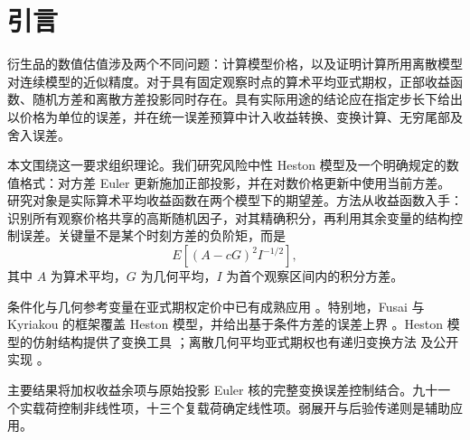 \begin{abstract}
本文研究指定 Heston 模型及其原始方差正部 Euler 格式下、具有十二个月度观察时点的有界算术平均亚式看涨价差
\(\psi(A)=(A-95)^+-(A-110)^+\)，并构造有限误差证书。共同高斯因子使非负收益余项可由加权二阶矩控制。经验证的变换运算计入投影修正、积分尾部、反演误差、复对数分支及舍入误差。在
\(\theta_*=(3,.045,.23,-.55,.045)\)、\(h=1/768\) 时，Euler 价格减连续模型价格的带符号差值位于
\[
[-0.011024692273,\;0.010642371599],
\]
连续模型下的看涨价差价格位于
\[
[6.508371733,\;6.518868974].
\]
另一初始方差参数点也具有完整证书。步长比较揭示了由收益余项主导的区间宽度平台；本文还推导出使精确非线性贡献最小的共同几何尺度。两项辅助结果分别适用于不同参数域：当
\(\xi=0\) 时，九个看跌期权和亚式价差具有共同的一阶展开公式及显式余项界；在
\(\xi\in[10^{-7},10^{-6}]\) 的受限连续先验下，后验目标分位数的位移具有认证上界。本文的贡献在于加权收益结构，以及针对指定原始离散核的完整有限误差核算，并由可执行数值包提供支撑。
\end{abstract}

\section{引言}

衍生品的数值估值涉及两个不同问题：计算模型价格，以及证明计算所用离散模型对连续模型的近似精度。对于具有固定观察时点的算术平均亚式期权，正部收益函数、随机方差和离散方差投影同时存在。具有实际用途的结论应在指定步长下给出以价格为单位的误差，并在统一误差预算中计入收益转换、变换计算、无穷尾部及舍入误差。

本文围绕这一要求组织理论。我们研究风险中性 Heston 模型及一个明确规定的数值格式：对方差 Euler 更新施加正部投影，并在对数价格更新中使用当前方差。研究对象是实际算术平均收益函数在两个模型下的期望差。方法从收益函数入手：识别所有观察价格共享的高斯随机因子，对其精确积分，再利用其余变量的结构控制误差。关键量不是某个时刻方差的负阶矩，而是
\[
E\!\left[(A-cG)^2 I^{-1/2}\right],
\]
其中 \(A\) 为算术平均，\(G\) 为几何平均，\(I\) 为首个观察区间内的积分方差。

条件化与几何参考变量在亚式期权定价中已有成熟应用 \cite{Curran1994,RogersShi1995,Thompson2002,FusaiKyriakou2016}。特别地，Fusai 与 Kyriakou 的框架覆盖 Heston 模型，并给出基于条件方差的误差上界 \cite{FusaiKyriakou2016}。Heston 模型的仿射结构提供了变换工具 \cite{Heston1993}；离散几何平均亚式期权也有递归变换方法 \cite{KimKimKimWee2016} 及公开实现 \cite{QuantLibDiscreteGeometricHeston}。

主要结果将加权收益余项与原始投影 Euler 核的完整变换误差控制结合。九十一个实载荷控制非线性项，十三个复载荷确定线性项。弱展开与后验传递则是辅助应用。

